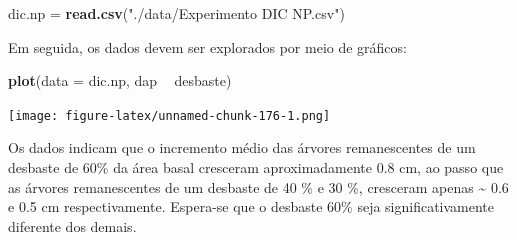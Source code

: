 \documentclass[
]{article}
\newenvironment{Shaded}{\begin{snugshade}}{\end{snugshade}}
\newcommand{\DataTypeTok}[1]{\textcolor[rgb]{0.13,0.29,0.53}{#1}}
\newcommand{\KeywordTok}[1]{\textcolor[rgb]{0.13,0.29,0.53}{\textbf{#1}}}
\newcommand{\NormalTok}[1]{#1}
\newcommand{\OperatorTok}[1]{\textcolor[rgb]{0.81,0.36,0.00}{\textbf{#1}}}
\newcommand{\OtherTok}[1]{\textcolor[rgb]{0.56,0.35,0.01}{#1}}
\newcommand{\StringTok}[1]{\textcolor[rgb]{0.31,0.60,0.02}{#1}}
\begin{document}
\begin{Shaded}
\begin{Highlighting}[]
\NormalTok{dic.np =}\StringTok{ }\KeywordTok{read.csv}\NormalTok{(}\StringTok{"./data/Experimento DIC NP.csv"}\NormalTok{)}
\end{Highlighting}
\end{Shaded}

Em seguida, os dados devem ser explorados por meio de gráficos:

\begin{Shaded}
\begin{Highlighting}[]
\KeywordTok{plot}\NormalTok{(}\DataTypeTok{data =}\NormalTok{ dic.np, dap }\OperatorTok{~}\StringTok{ }\NormalTok{desbaste)}
\end{Highlighting}
\end{Shaded}

\texttt{[image: figure-latex/unnamed-chunk-176-1.png]}

Os dados indicam que o incremento médio das árvores remanescentes de um desbaste de 60\% da área basal cresceram aproximadamente 0.8 cm, ao passo que as árvores remanescentes de um desbaste de 40 \% e 30 \%, cresceram apenas \textasciitilde{} 0.6 e 0.5 cm respectivamente. Espera-se que o desbaste 60\% seja significativamente diferente dos demais.

\begin{Shaded}
\end{Shaded}
\end{document}
